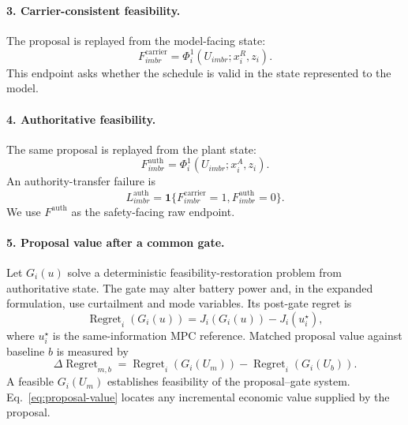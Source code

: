 \documentclass[11pt]{article}
\begin{document}
\paragraph{3. Carrier-consistent feasibility.}
The proposal is replayed from the model-facing state:
\begin{equation}
 F^{\mathrm{carrier}}_{imbr}=\Phi_i^1(U_{imbr};x_i^R,z_i).
 \label{eq:carrier-feasible}
\end{equation}
This endpoint asks whether the schedule is valid in the state represented to the model.

\paragraph{4. Authoritative feasibility.}
The same proposal is replayed from the plant state:
\begin{equation}
 F^{\mathrm{auth}}_{imbr}=\Phi_i^1(U_{imbr};x_i^A,z_i).
 \label{eq:auth-feasible}
\end{equation}
An authority-transfer failure is
\begin{equation}
 L^{\mathrm{auth}}_{imbr}=\mathbf{1}\{F^{\mathrm{carrier}}_{imbr}=1,
 F^{\mathrm{auth}}_{imbr}=0\}.
 \label{eq:authority-loss}
\end{equation}
We use $F^{\mathrm{auth}}$ as the safety-facing raw endpoint.

\paragraph{5. Proposal value after a common gate.}
Let $G_i(u)$ solve a deterministic feasibility-restoration problem from authoritative state. The
gate may alter battery power and, in the expanded formulation, use curtailment and mode variables.
Its post-gate regret is
\begin{equation}
 \operatorname{Regret}_i(G_i(u))=J_i(G_i(u))-J_i(u_i^{\star}),
 \label{eq:regret}
\end{equation}
where $u_i^{\star}$ is the same-information MPC reference. Matched proposal value against baseline
$b$ is measured by
\begin{equation}
 \Delta\operatorname{Regret}_{m,b}
 =\operatorname{Regret}_i(G_i(U_m))-\operatorname{Regret}_i(G_i(U_b)).
 \label{eq:proposal-value}
\end{equation}
A feasible $G_i(U_m)$ establishes feasibility of the proposal--gate system. Eq.~\eqref{eq:proposal-value}
locates any incremental economic value supplied by the proposal.
\end{document}
